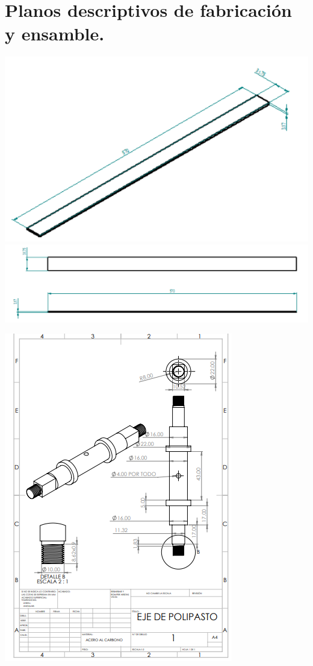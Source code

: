 \section{Planos descriptivos de fabricación y ensamble.}



\begin{center}
\includegraphics[width=.6\linewidth]{A/figs/B_1.png} 
 \includegraphics[width=.6\linewidth]{A/figs/B_2.png} 

\end{center}

\begin{center}
\includegraphics[width=1\linewidth]{A/figs/C_1.png} 
\end{center}

